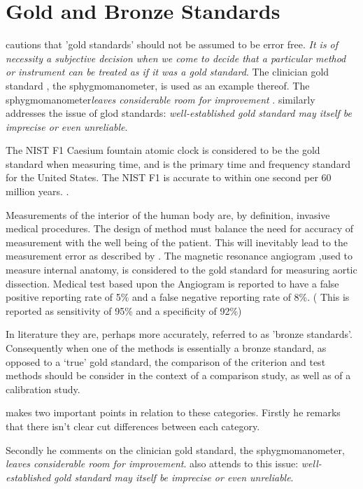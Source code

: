 \documentclass[12pt, a4paper]{report}
\theoremstyle{plain}
\theoremstyle{definition}
\theoremstyle{remark}
\begin{document}
	
	

	\section{Gold and Bronze Standards}
	
	\noindent \citet[p.47]{DunnSEME} cautions that 'gold standards' should not be assumed to be error free. \emph{It is of necessity a subjective decision when we come to decide that a particular method or instrument can be treated as if it was a gold standard}.
	The clinician gold standard , the sphygmomanometer, is used as an example thereof.  The sphygmomanometer\emph{leaves considerable room for improvement} \citep{DunnSEME}. \citet{pizzi} similarly addresses the issue of glod standards: \emph{well-established gold standard may itself be imprecise or even unreliable}.
	
	
	The NIST F1 Caesium fountain atomic clock is considered to be the gold standard when measuring time, and is the primary time and frequency standard for the United States. The NIST F1 is accurate
	to within one second per 60 million years. \citep{NIST}.
	
	Measurements of the interior of the human body are, by definition, invasive medical procedures. The design of method must balance the need for accuracy of measurement with the well being of the patient. This will inevitably lead to the measurement error as described by \citet{DunnSEME}. The magnetic resonance angiogram ,used to measure internal anatomy,  is considered to the gold standard for measuring aortic dissection. Medical test based upon the Angiogram is reported to have a false positive reporting rate of 5\% and a false negative reporting rate of 8\%. ( This is
	reported as sensitivity of 95\% and a specificity of 92\%)
	\citep{ACR}
	
	In literature they are, perhaps more accurately, referred to as
	'bronze standards'. Consequently when one of the methods is
	essentially a bronze standard, as opposed to a `true' gold
	standard, the comparison of the criterion and test methods should
	be consider in the context of a comparison study, as well as of a calibration study.
	
	
	\citet{DunnSEME} makes two important points in relation to these
	categories. Firstly he remarks that there isn't clear cut differences between each category.
	
	Secondly he comments on the clinician gold standard, the
	sphygmomanometer, \emph{leaves considerable room for improvement}.
	\citet{pizzi} also attends to this issue: \emph{well-established
		gold standard may itself be imprecise or even unreliable}.
	
\end{document}
